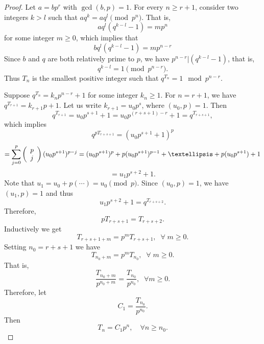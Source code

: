 \documentclass[10pt,a4paper]{amsart}
\begin{document}
\begin{proof}
Let $a=bp^r$ with $\gcd(b,p)=1$. For every $n\geq r+1$, consider two integers $k>l$ 
such that $aq^k=aq^l \pmod{p^n}$. That is, 
$$
aq^l(q^{k-l}-1)= m p^n
$$
for some integer $m\geq 0$, 
which implies that 
$$
b q^l(q^{k-l}-1)=mp^{n-r}
$$
Since $b$ and $q$ are both relatively prime to $p$, we have $p^{n-r}|(q^{k-l}-1)$, that is,
$$
q^{k-l}=1\pmod{p^{n-r}}.
$$
Thus $T_{n}$ is the smallest positive integer such that $q^{T_{n}}=1\mod p^{n-r}$. 

Suppose $q^{T_n}=k_{n} p^{n-r}+1$ for some integer $k_{n}\geq 1$. 
For $n=r+1$, we have
$q^{T_{r+1}}=k_{r+1}p+1$.
Let us write $k_{r+1}=u_0p^s$, where $(u_0,p)=1$. Then
$$
q^{T_{r+1}}=u_0p^{s+1}+1=u_0p^{(r+s+1)-r}+1=q^{T_{r+s+1}},
$$
which implies
$$
q^{pT_{r+s+1}}=(u_0p^{s+1}+1)^p
$$
$$
=\sum_{j=0}^p\left(\begin{array}{l}p\cr                           j
\end{array}\right)(u_0p^{s+1})^{p-j} =(u_0p^{s+1})^p+p(u_0p^{s+1})^{p-1}+\ldots+p(u_0p^{s+1})+1
$$
$$
=u_1p^{s+2}+1.
$$
Note that
$u_1=u_0+p(\cdots)=u_0\pmod{p}$.
Since $(u_0,p)=1$, we have $(u_1,p)=1$ and thus
$$
u_1p^{s+2}+1=q^{T_{r+s+2}}.
$$
Therefore,
$$
pT_{r+s+1}=T_{r+s+2}.
$$
Inductively we get
$$
T_{r+s+1+m}=p^mT_{r+s+1}, \;\;\forall \; m\geq 0.
$$
Setting $n_0=r+s+1$ we have
$$
T_{n_0+m}=p^mT_{n_0}, \;\;\forall \; m\geq 0.
$$
That is,
$$
\frac{T_{n_0+m}}{p^{n_0+m}}=\frac{T_{n_0}}{p^{n_0}},\;\;\forall m\geq 0.
$$
Therefore, let
$$
C_{1}=\frac{T_{n_0}}{p^{n_0}}.
$$
Then
\[T_n=C_{1}p^n, \quad\forall n\geq n_0.\]
\end{proof}
\end{document}
